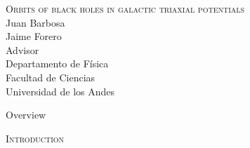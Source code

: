 \documentclass[handout]{beamer}
\begin{document}
\begin{frame}
	\centering
	\textsc{\LARGE Orbits of black holes in galactic triaxial potentials}
	\\
	\vspace{2.5cm}
	Juan Barbosa\\
	\vspace{1cm}
	\small
	Jaime Forero\\ 
	Advisor\\
	\vspace{0.5cm}
	\footnotesize
	Departamento de F\'isica\\
	Facultad de Ciencias\\
	Universidad de los Andes
\end{frame}

\begin{frame}{Overview}
	\tableofcontents
\end{frame}

\begin{frame}
	\centering
	\Huge
	\scshape
	Introduction
\end{frame}
\end{document}
